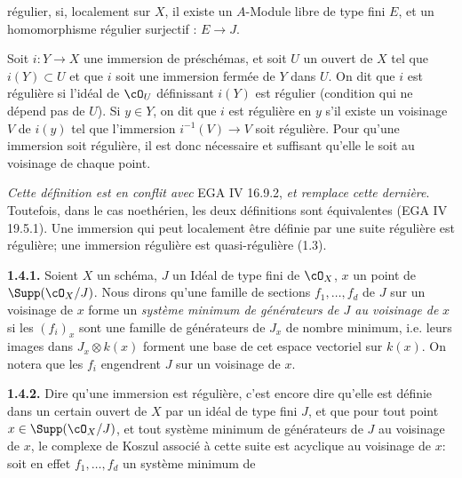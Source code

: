 régulier, si, localement sur $X$, il existe un $A$-Module libre de type fini $E$, et un homomorphisme régulier surjectif : $E\longrightarrow J$.

Soit $i:Y\longrightarrow X$ une immersion de préschémas, et soit $U$ un ouvert de $X$ tel que $i(Y)\subset U$ et que $i$ soit une immersion fermée de $Y$ dans $U$. On dit que $i$ est régulière si l'idéal de $\cO_U$ définissant $i(Y)$ est régulier (condition qui ne dépend pas de $U$). Si $y\in Y$, on dit que $i$ est régulière en $y$ s'il existe un voisinage $V$ de $i(y)$ tel que l'immersion $i^{-1}(V)\longrightarrow V$ soit régulière. Pour qu'une immersion soit régulière, il est donc nécessaire et suffisant qu'elle le soit au voisinage de chaque point.

\emph{Cette définition est en conflit avec} EGA IV 16.9.2, \emph{et remplace cette dernière}. Toutefois, dans le cas noethérien, les deux définitions sont équivalentes (EGA IV 19.5.1). Une immersion qui peut localement être définie par une suite régulière est régulière; une immersion régulière est quasi-régulière (1.3).

\textbf{1.4.1.} Soient $X$ un schéma, $J$ un Idéal de type fini de $\cO_X$, $x$ un point de $\Supp(\cO_X/J)$. Nous dirons qu'une famille de sections $f_1,\ldots,f_d$ de $J$ sur un voisinage de $x$ forme un \emph{système minimum de générateurs de $J$ au voisinage de} $x$ si les $(f_i)_x$ sont une famille de générateurs de $J_x$ de nombre minimum, i.e. leurs images dans $J_x\otimes k(x)$ forment une base de cet espace vectoriel sur $k(x)$. On notera que les $f_i$ engendrent $J$ sur un voisinage de $x$.

\textbf{1.4.2.} Dire qu'une immersion est régulière, c'est encore dire qu'elle est définie dans un certain ouvert de $X$ par un idéal de type fini $J$, et que pour tout point $x\in\Supp(\cO_X/J)$, et tout système minimum de générateurs de $J$ au voisinage de $x$, le complexe de Koszul associé à cette suite est acyclique au voisinage de $x$: soit en effet $f_1,\ldots,f_d$ un système minimum de
